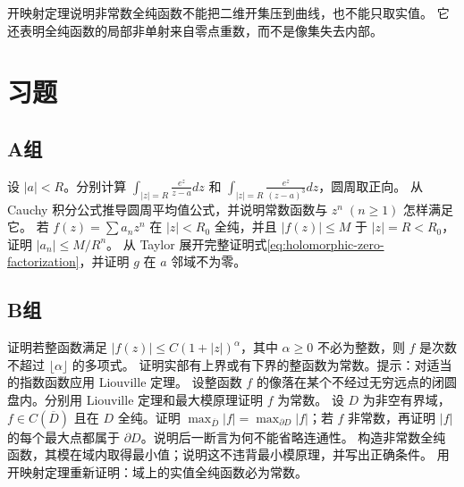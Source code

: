 开映射定理说明非常数全纯函数不能把二维开集压到曲线，也不能只取实值。
它还表明全纯函数的局部非单射来自零点重数，而不是像集失去内部。

\section*{习题}
\subsection*{A组}
\begin{enumerate}[label=\textbf{\thechapter.\arabic*.}]
设 \(|a|<R\)。分别计算
\(\int_{|z|=R}\frac{e^z}{z-a}dz\) 和
\(\int_{|z|=R}\frac{e^z}{(z-a)^3}dz\)，圆周取正向。
从 Cauchy 积分公式推导圆周平均值公式，并说明常数函数与 \(z^n\;(n\ge1)\) 怎样满足它。
若 \(f(z)=\sum a_nz^n\) 在 \(|z|<R_0\) 全纯，并且 \(|f(z)|\le M\) 于 \(|z|=R<R_0\)，证明 \(|a_n|\le M/R^n\)。
从 Taylor 展开完整证明式\eqref{eq:holomorphic-zero-factorization}，并证明 \(g\) 在 \(a\) 邻域不为零。
\end{enumerate}
\subsection*{B组}
\begin{enumerate}[label=\textbf{\thechapter.\arabic*.},resume]
证明若整函数满足 \(|f(z)|\le C(1+|z|)^\alpha\)，其中 \(\alpha\ge0\) 不必为整数，则 \(f\) 是次数不超过 \(\lfloor\alpha\rfloor\) 的多项式。
证明实部有上界或有下界的整函数为常数。提示：对适当的指数函数应用 Liouville 定理。
设整函数 \(f\) 的像落在某个不经过无穷远点的闭圆盘内。分别用 Liouville 定理和最大模原理证明 \(f\) 为常数。
设 \(D\) 为非空有界域，\(f\in C(\overline D)\) 且在 \(D\) 全纯。证明 \(\max_{\overline D}|f|=\max_{\partial D}|f|\)；若 \(f\) 非常数，再证明 \(|f|\) 的每个最大点都属于 \(\partial D\)。说明后一断言为何不能省略连通性。
构造非常数全纯函数，其模在域内取得最小值；说明这不违背最小模原理，并写出正确条件。
用开映射定理重新证明：域上的实值全纯函数必为常数。
\end{enumerate}
